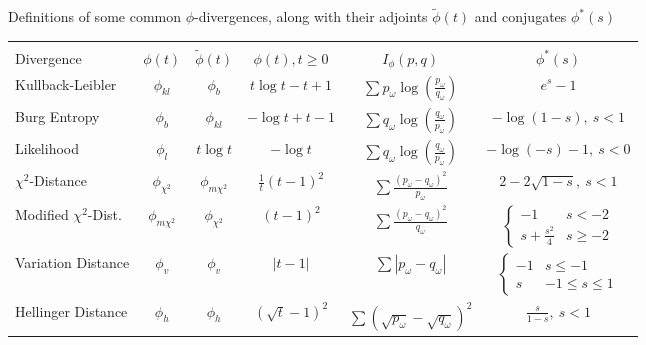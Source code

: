 \documentclass[ijoc,letterpaper]{informs3} %
\begin{document}
\begin{table}
	\TABLE
	{
		Definitions of some common $\phi$-divergences, along with their adjoints $\tilde{\phi}(t)$ and conjugates $\phi^*(s)$
		\label{tb:phi_definitions}
	}
	{\begin{tabular}{lccccc}
		\hline \\
		Divergence                        & $\phi(t)$          & $\tilde{\phi}(t)$               & $\phi(t), t \geq 0$   & $I_\phi(p,q)$     & $\phi^*(s)$ \\
		\hline
		Kullback-Leibler                  & $\phi_{kl}$        & $\phi_b$                        & $t\log t - t + 1$     & $\sum p_\omega \log\left(\frac{p_\omega}{q_\omega}\right)$ & $e^s - 1$ \\
		Burg Entropy                      & $\phi_b$           & $\phi_{kl}$                     & $-\log t + t - 1$     & $\sum q_\omega \log\left(\frac{q_\omega}{p_\omega}\right)$ & $-\log(1-s),\ s < 1$  \\
		Likelihood                        & $\phi_l$           & $t\log t $                      & $-\log t$             & $\sum q_\omega \log\left(\frac{q_\omega}{p_\omega}\right)$ & $-\log(-s) - 1,\ s < 0$ \\
		$\chi^2$-Distance                 & $\phi_{\chi^2}$    & $\phi_{m\chi^2}$                & $\frac{1}{t} (t-1)^2$ & $\sum \frac{(p_\omega-q_\omega)^2}{p_\omega}$              & $2 - 2\sqrt{1-s},\ s < 1$  \\
		Modified $\chi^2$-Dist.           & $\phi_{m\chi^2}$   & $\phi_{\chi^2}$                 & $(t-1)^2$             & $\sum \frac{(p_\omega - q_\omega)^2}{q_\omega}$            & $\begin{cases} -1 & s < -2 \\ s + \frac{s^2}{4} & s \geq -2 \end{cases}$ \\
		Variation Distance                & $\phi_v$           & $\phi_v$                        & $|t-1|$               & $\sum |p_\omega - q_\omega|$                               & $\begin{cases} -1 & s \leq -1 \\ s & -1 \leq s \leq 1 \end{cases}$ \\
		Hellinger Distance                & $\phi_h$           & $\phi_h$                        & $(\sqrt{t} - 1)^2$    & $\sum (\sqrt{p_\omega} - \sqrt{q_\omega})^2$               & $\frac{s}{1-s},\ s < 1$ \\
	\hline
	\end{tabular}}
	{}
\end{table}
\end{document}
